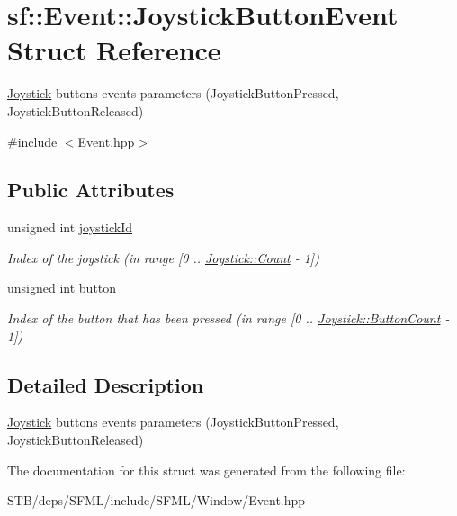 \hypertarget{structsf_1_1_event_1_1_joystick_button_event}{\section{sf\+:\+:Event\+:\+:Joystick\+Button\+Event Struct Reference}
\label{structsf_1_1_event_1_1_joystick_button_event}
}


\hyperlink{classsf_1_1_joystick}{Joystick} buttons events parameters (Joystick\+Button\+Pressed, Joystick\+Button\+Released)  




{\ttfamily \#include $<$Event.\+hpp$>$}

\subsection*{Public Attributes}
\begin{DoxyCompactItemize}
\item 
\hypertarget{structsf_1_1_event_1_1_joystick_button_event_a2f80ecdb964a5ae0fc30726a404c41ec}{unsigned int \hyperlink{structsf_1_1_event_1_1_joystick_button_event_a2f80ecdb964a5ae0fc30726a404c41ec}{joystick\+Id}}\label{structsf_1_1_event_1_1_joystick_button_event_a2f80ecdb964a5ae0fc30726a404c41ec}

\begin{DoxyCompactList}\small\item\em Index of the joystick (in range \mbox{[}0 .. \hyperlink{classsf_1_1_joystick_a951a7c775921304a5f3443c6e2bb4d65a6e0a2a95bc1da277610c04d80f52715e}{Joystick\+::\+Count} -\/ 1\mbox{]}) \end{DoxyCompactList}\item 
\hypertarget{structsf_1_1_event_1_1_joystick_button_event_a6412e698a2f7904c5aa875a0d1b34da4}{unsigned int \hyperlink{structsf_1_1_event_1_1_joystick_button_event_a6412e698a2f7904c5aa875a0d1b34da4}{button}}\label{structsf_1_1_event_1_1_joystick_button_event_a6412e698a2f7904c5aa875a0d1b34da4}

\begin{DoxyCompactList}\small\item\em Index of the button that has been pressed (in range \mbox{[}0 .. \hyperlink{classsf_1_1_joystick_a951a7c775921304a5f3443c6e2bb4d65a2f1b8a0a59f2c12a4775c0e1e69e1816}{Joystick\+::\+Button\+Count} -\/ 1\mbox{]}) \end{DoxyCompactList}\end{DoxyCompactItemize}


\subsection{Detailed Description}
\hyperlink{classsf_1_1_joystick}{Joystick} buttons events parameters (Joystick\+Button\+Pressed, Joystick\+Button\+Released) 

The documentation for this struct was generated from the following file\+:\begin{DoxyCompactItemize}
\item 
S\+T\+B/deps/\+S\+F\+M\+L/include/\+S\+F\+M\+L/\+Window/Event.\+hpp\end{DoxyCompactItemize}
